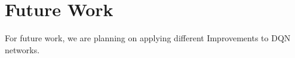 \section{Future Work}
\label{future}
For future work, we are planning on applying  different Improvements to DQN networks.